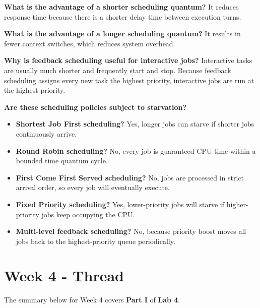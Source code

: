 \documentclass[conference]{IEEEtran}
\begin{document}
\vspace{0.3em}
\noindent \textbf{What is the advantage of a shorter scheduling quantum?} 
It reduces response time because there is a shorter delay time between execution turns.

\hspace{5pt}

\vspace{0.3em}
\noindent \textbf{What is the advantage of a longer scheduling quantum?} 
It results in fewer context switches, which reduces system overhead.

\hspace{5pt}

\vspace{0.3em}
\noindent \textbf{Why is feedback scheduling useful for interactive jobs?} 
Interactive tasks are usually much shorter and frequently start and stop. Because feedback scheduling assigns every new task the highest priority, interactive jobs are run at the highest priority.

\hspace{5pt}

\vspace{0.3em}
\noindent \textbf{Are these scheduling policies subject to starvation?} 

\begin{itemize}
    \item \textbf{Shortest Job First scheduling?} Yes, longer jobs can starve if shorter jobs continuously arrive.
    \item \textbf{Round Robin scheduling?} No, every job is guaranteed CPU time within a bounded time quantum cycle.
    \item \textbf{First Come First Served scheduling?} No, jobs are processed in strict arrival order, so every job will eventually execute.
    \item \textbf{Fixed Priority scheduling?} Yes, lower-priority jobs will starve if higher-priority jobs keep occupying the CPU.
    \item \textbf{Multi-level feedback scheduling?} No, because priority boost moves all jobs back to the highest-priority queue periodically.
\end{itemize}

\section{Week 4 - Thread}

\noindent The summary below for Week 4 covers \textbf{Part I} of \textbf{Lab 4}.
\end{document}
